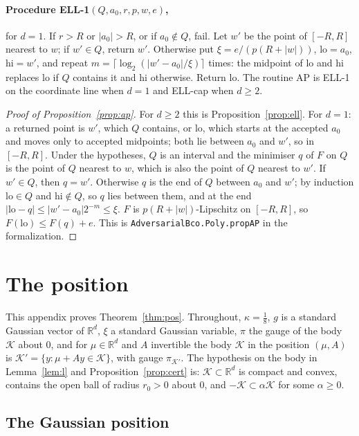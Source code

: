 \documentclass[11pt]{amsart}
\theoremstyle{definition}
\numberwithin{equation}{section}
\newcommand{\R}{\mathbb{R}}
\newcommand{\cK}{\mathcal{K}}
\begin{document}
\paragraph{Procedure ELL-1$(Q,a_0,r,p,w,e)$,} for $d=1$. If $r>R$ or $|a_0|>R$, or if $a_0\notin Q$, fail. Let $w'$ be the point of $[-R,R]$ nearest to $w$; if $w'\in Q$, return $w'$. Otherwise put $\xi=e/(p(R+|w|))$, $\mathrm{lo}=a_0$, $\mathrm{hi}=w'$, and repeat $m=\lceil\log_2(|w'-a_0|/\xi)\rceil$ times: the midpoint of $\mathrm{lo}$ and $\mathrm{hi}$ replaces $\mathrm{lo}$ if $Q$ contains it and $\mathrm{hi}$ otherwise. Return $\mathrm{lo}$. The routine AP is ELL-1 on the coordinate line when $d=1$ and ELL-cap when $d\ge2$.

\begin{proof}[Proof of Proposition~\ref{prop:ap}]
For $d\ge2$ this is Proposition~\ref{prop:ell}. For $d=1$: a returned point is $w'$, which $Q$ contains, or $\mathrm{lo}$, which starts at the accepted $a_0$ and moves only to accepted midpoints; both lie between $a_0$ and $w'$, so in $[-R,R]$. Under the hypotheses, $Q$ is an interval and the minimiser $q$ of $F$ on $Q$ is the point of $Q$ nearest to $w$, which is also the point of $Q$ nearest to $w'$. If $w'\in Q$, then $q=w'$. Otherwise $q$ is the end of $Q$ between $a_0$ and $w'$; by induction $\mathrm{lo}\in Q$ and $\mathrm{hi}\notin Q$, so $q$ lies between them, and at the end $|\mathrm{lo}-q|\le|w'-a_0|2^{-m}\le\xi$. $F$ is $p(R+|w|)$-Lipschitz on $[-R,R]$, so $F(\mathrm{lo})\le F(q)+e$.
This is \texttt{AdversarialBco.Poly.propAP} in the formalization.
\end{proof}

\section{The position}\label{app:pg}

This appendix proves Theorem~\ref{thm:pos}. Throughout, $\kappa=\frac18$, $g$ is a standard Gaussian vector of $\R^d$, $\xi$ a standard Gaussian variable, $\pi$ the gauge of the body $\cK$ about $0$, and for $\mu\in\R^d$ and $A$ invertible the body $\cK$ in the position $(\mu,A)$ is $\cK'=\{y:\mu+Ay\in\cK\}$, with gauge $\pi_{\cK'}$. The hypothesis on the body in Lemma~\ref{lem:l} and Proposition~\ref{prop:cert} is: $\cK\subset\R^d$ is compact and convex, contains the open ball of radius $r_0>0$ about $0$, and $-\cK\subset\alpha\cK$ for some $\alpha\ge0$.

\subsection{The Gaussian position}
\end{document}
